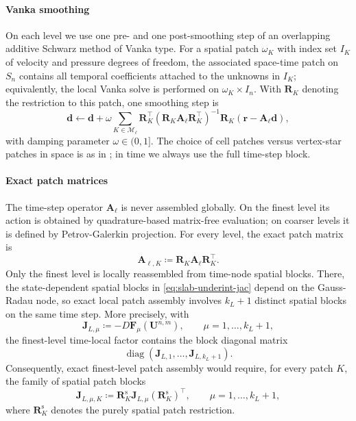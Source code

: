 \documentclass[DIV=16]{scrartcl}
\DeclareMathOperator{\diag}{diag}
\newcommand{\In}{I_n}
\newcommand{\Sn}{S_n}
\begin{document}
\paragraph{Vanka smoothing}
On each level we use one pre- and one post-smoothing step of an overlapping
additive Schwarz method of Vanka type.
For a spatial patch $\omega_K$ with index set $I_K$ of velocity and pressure
degrees of freedom, the associated space-time patch on $\Sn$ contains all
temporal coefficients attached to the unknowns in $I_K$; equivalently, the local
Vanka solve is performed on $\omega_K\times \In$.
With $\bm R_K$ denoting the restriction to this patch, one smoothing step is
\begin{equation}\label{eq:stmg-vanka-update}
  \bm d \leftarrow
  \bm d + \omega \sum_{K\in\mathcal M_\ell}
  \bm R_K^\top
  (\bm R_K \bm A_\ell \bm R_K^\top)^{-1}
  \bm R_K(\bm r-\bm A_\ell \bm d),
\end{equation}
with damping parameter $\omega\in(0,1]$.
The choice of cell patches versus vertex-star patches in space is as in
\cite{MargenbergBause2026MonolithicSTMG,MargenbergMunchBause2025hpMGStokes};
in time we always use the full time-step block.

\paragraph{Exact patch matrices}
The time-step operator $\bm A_\ell$ is never assembled globally.
On the finest level its action is obtained by quadrature-based matrix-free
evaluation; on coarser levels it is defined by Petrov-Galerkin projection.
For every level, the exact patch matrix is
\[
  \bm A_{\ell,K}\coloneq \bm R_K \bm A_\ell \bm R_K^\top.
\]
Only the finest level is locally reassembled from time-node spatial blocks.
There, the state-dependent spatial blocks in \eqref{eq:slab-underint-jac}
depend on the Gauss-Radau node, so exact local patch assembly involves
$k_L+1$ distinct spatial blocks on the same time step.
More precisely, with
\[
  \bm J_{L,\mu}\coloneq -D\bm F_{\mu}(\bm U^{n,m}),
  \qquad \mu=1,\dots,k_L+1,
\]
the finest-level time-local factor contains the block diagonal matrix
\[
  \diag(\bm J_{L,1},\dots,\bm J_{L,k_L+1}).
\]
Consequently, exact finest-level patch assembly would require, for every patch
$K$, the family of spatial patch blocks
\[
  \bm J_{L,\mu,K}\coloneq
  \bm R_K^{\mathrm s}\bm J_{L,\mu}(\bm R_K^{\mathrm s})^\top,
  \qquad \mu=1,\dots,k_L+1,
\]
where $\bm R_K^{\mathrm s}$ denotes the purely spatial patch restriction.
\end{document}
